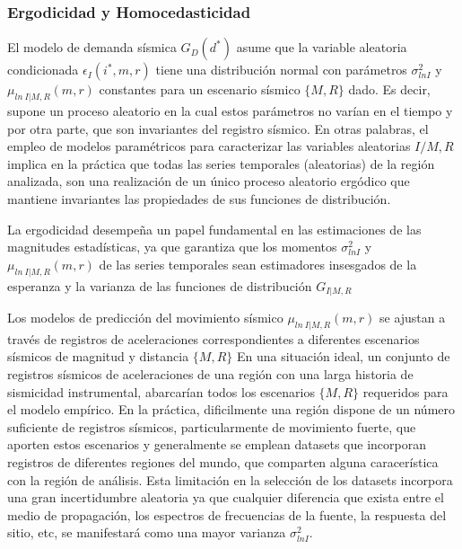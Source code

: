 \documentclass[
]{krantz}
\begin{document}
\hypertarget{ergodicidad-y-homocedasticidad}{%
\subsubsection*{Ergodicidad y Homocedasticidad}\label{ergodicidad-y-homocedasticidad}}

El modelo de demanda sísmica \(G_D(d^*)\) asume que la variable aleatoria condicionada \(\epsilon_{I}(i^*,m,r)\) tiene una distribución normal con parámetros \(\sigma_{ln I}^2\) y \(\mu_{ln \ I|M,R}(m,r)\) constantes para un escenario sísmico \(\{M,R\}\) dado. Es decir, supone un proceso aleatorio en la cual estos parámetros no varían en el tiempo y por otra parte, que son invariantes del registro sísmico. En otras palabras, el empleo de modelos paramétricos para caracterizar las variables aleatorias \(I/M,R\) implica en la práctica que todas las series temporales (aleatorias) de la región analizada, son una realización de un único proceso aleatorio ergódico que mantiene invariantes las propiedades de sus funciones de distribución.

La ergodicidad desempeña un papel fundamental en las estimaciones de las magnitudes estadísticas, ya que garantiza que los momentos \(\sigma_{ln I}^2\) y \(\mu_{ln \ I|M,R}(m,r)\) de las series temporales sean estimadores insesgados de la esperanza y la varianza de las funciones de distribución \(G_{I|M,R}\)

Los modelos de predicción del movimiento sísmico \(\mu_{ln \ I|M,R}(m,r)\) se ajustan a través de registros de aceleraciones correspondientes a diferentes escenarios sísmicos de magnitud y distancia \(\{M,R\}\) En una situación ideal, un conjunto de registros sísmicos de aceleraciones de una región con una larga historia de sismicidad instrumental, abarcarían todos los escenarios \(\{M,R\}\) requeridos para el modelo empírico. En la práctica, dificilmente una región dispone de un número suficiente de registros sísmicos, particularmente de movimiento fuerte, que aporten estos escenarios y generalmente se emplean datasets que incorporan registros de diferentes regiones del mundo, que comparten alguna caracerística con la región de análisis. Esta limitación en la selección de los datasets incorpora una gran incertidumbre aleatoria ya que cualquier diferencia que exista entre el medio de propagación, los espectros de frecuencias de la fuente, la respuesta del sitio, etc, se manifestará como una mayor varianza \(\sigma_{ln I}^2\).
\end{document}
